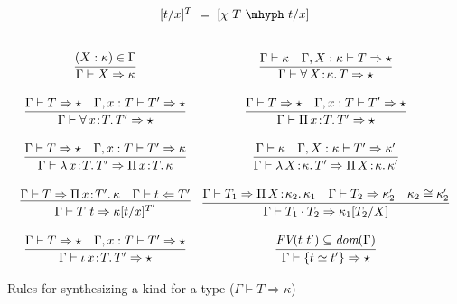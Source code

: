\documentclass{article}
\newcommand{\abs}[4]{{#1}\, #2\! : \! #3.\, #4}
\newcommand{\tpcheck}[0]{\Leftarrow}
\newcommand{\tpsynth}[0]{\Rightarrow}
\begin{document}
\begin{figure}
  \[
    \begin{array}{c}
      [t/x]^T\ =\ [\chi\ T\ \mhyph\ t/x]
      \\ \\ \\
  \begin{array}{cc}
    \infer{\Gamma \vdash X \tpsynth \kappa}{(X : \kappa) \in \Gamma} &
    \infer{\Gamma\vdash \abs{\forall}{X}{\kappa}{T} \tpsynth \star}{\Gamma \vdash \kappa & \Gamma,X:\kappa\vdash T \tpsynth \star} \\ \\
    \infer{\Gamma\vdash\abs{\forall}{x}{T}{T'} \tpsynth \star}{\Gamma \vdash T \tpsynth \star & \Gamma,x:T\vdash T' \tpsynth \star} &
    \infer{\Gamma\vdash\abs{\Pi}{x}{T}{T'} \tpsynth \star}{\Gamma \vdash T \tpsynth \star & \Gamma,x:T\vdash T' \tpsynth \star} \\ \\
    \infer{\Gamma\vdash\abs{\lambda}{x}{T}{T'} \tpsynth \abs{\Pi}{x}{T}{\kappa}}{\Gamma \vdash T \tpsynth \star & \Gamma,x:T\vdash T'\tpsynth\kappa} &
    \infer{\Gamma\vdash\abs{\lambda}{X}{\kappa}{T'} \tpsynth \abs{\Pi}{X}{\kappa}{\kappa'}}{\Gamma \vdash \kappa & \Gamma,X:\kappa\vdash T'\tpsynth\kappa'} \\ \\
    \infer{\Gamma\vdash T\ t \tpsynth \kappa[t/x]^{T'}}{\Gamma\vdash T \tpsynth \abs{\Pi}{x}{T'}{\kappa} & \Gamma\vdash t \tpcheck T'} &
    \infer{\Gamma\vdash T_1 \cdot T_2 \tpsynth \kappa_1[T_2/X]}{\Gamma\vdash T_1 \tpsynth \abs{\Pi}{X}{\kappa_2}{\kappa_1} & \Gamma\vdash T_2 \tpsynth \kappa_2' & \kappa_2 \cong \kappa_2'} \\ \\
    \infer{\Gamma\vdash\abs{\iota}{x}{T}{T'} \tpsynth \star}{\Gamma \vdash T \tpsynth \star & \Gamma,x:T\vdash T' \tpsynth \star} &
    \infer{\Gamma\vdash \{ t \simeq t' \} \tpsynth \star}{\textit{FV}(t\ t')\subseteq\textit{dom}(\Gamma)}
  \end{array}
    \end{array}
  \]
  \caption{Rules for synthesizing a kind for a type ($\Gamma \vdash T \tpsynth \kappa$)}
  \label{fig:knd}
\end{figure}
\end{document}
